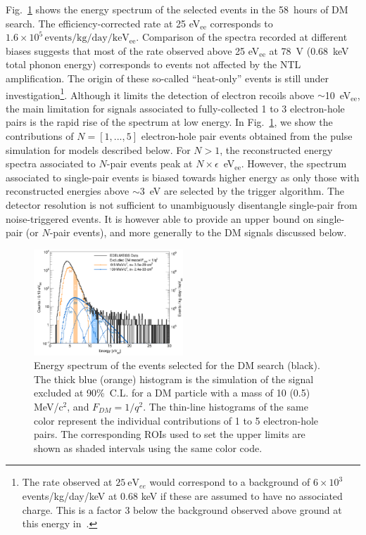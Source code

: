 \documentclass[aps,nofootinbib,floatfix,showpacs,preprintnumbers,twocolumn,superscriptaddress]{revtex4}
\begin{document}
Fig.~\ref{fig:data} shows the energy spectrum of the selected events in the 58~hours of DM search. The efficiency-corrected rate at 25 eV$_{\mathrm{ee}}$ corresponds to $1.6\times10^{5}\,\mathrm{events/kg/day/keV_{ee}}$. Comparison of the spectra recorded at different biases suggests that most of the rate observed above 25 eV$_{\mathrm{ee}}$ at 78~V (0.68~keV total phonon energy) corresponds to events not affected by the NTL amplification. The origin of these so-called ``heat-only'' events is still under investigation\footnote{The rate observed at $25~\mathrm{eV}_{ee}$ would correspond to a background of $6\times10^{3}$ events/kg/day/keV at 0.68 keV if these are assumed to have no associated charge. This is a factor 3 below the background observed above ground at this energy in~.}.
Although it limits the detection of electron recoils above $\sim$10~eV$_{\mathrm{ee}}$, the main limitation for signals associated to fully-collected 1 to 3 electron-hole pairs is the rapid rise of the spectrum at low energy.
In Fig.~\ref{fig:data}, we show the contributions of $N=[1,...,5]$ electron-hole pair events obtained from the pulse simulation for models described below. For $N>1$, the reconstructed energy spectra associated to $N$-pair events peak at $N\times\epsilon$~eV$_{\mathrm{ee}}$. However, the spectrum associated to single-pair events is biased towards higher energy as only those with reconstructed energies above $\sim3$~eV are selected by the trigger algorithm.
The detector resolution is not sufficient to unambiguously disentangle single-pair from noise-triggered events. 
It is however able to provide an upper bound on single-pair (or $N$-pair events), and more generally to the DM signals discussed below.
\begin{figure}[t]
\includegraphics[width=0.5\textwidth,angle=0]{Figures/nouveauplotspectre-postKlaus.pdf}
\caption{
Energy spectrum of the events selected for the DM search (black). The thick blue (orange) histogram is the simulation of the signal excluded at 90\%~C.L. for a DM particle with a mass of 10 (0.5) MeV/c$^2$, and $F_{DM}=1/q^2$. 
The thin-line histograms of the same color represent the individual contributions of 1 to 5 electron-hole pairs.
The corresponding ROIs used to set the upper limits are shown as shaded intervals using the same color code.
} 
\label{fig:data}
\end{figure}
\end{document}
